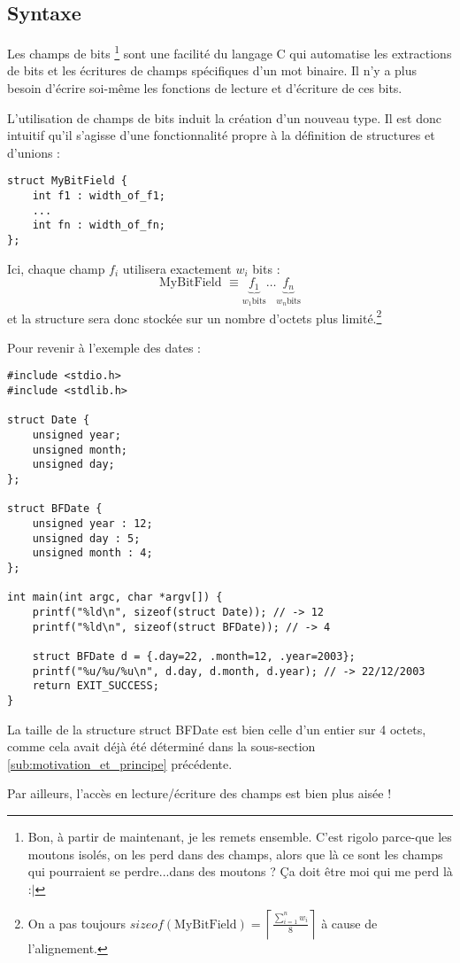 \documentclass[../../../main.tex]{subfiles}
\begin{document}
\subsection{Syntaxe}
\label{sub:syntaxe}
Les champs de bits \footnote{Bon, à partir de maintenant, je les remets ensemble. C'est rigolo parce-que les moutons isolés, on les perd dans des champs, alors que là ce sont les champs qui pourraient se perdre...dans des moutons ? Ça doit être moi qui me perd là :$|$} sont une facilité du langage C qui automatise les extractions de bits et les écritures
de champs spécifiques d'un mot binaire. Il n'y a plus besoin d'écrire soi-même les fonctions de lecture
et d'écriture de ces bits.

L'utilisation de champs de bits induit la création d'un nouveau type. Il est donc intuitif qu'il s'agisse d'une fonctionnalité propre à la définition de structures et d'unions :
\begin{verbatim}
struct MyBitField {
	int f1 : width_of_f1;
	...
	int fn : width_of_fn;
};
\end{verbatim}
Ici, chaque champ $f_{i}$ utilisera exactement $w_{i}$ bits :
$$\text{MyBitField }\equiv \underbrace{f_{1}}_{w_{1} \text{bits}}\dots \underbrace{f_{n}}_{w_{n} \text{bits}}$$
et la structure sera donc stockée sur un nombre d'octets plus limité.\footnote{On a pas toujours $sizeof(\text{MyBitField}) = \displaystyle\left\lceil\frac{\sum_{i= 1}^{n}w_{i}}{8}\right\rceil$ à cause de l'alignement.}

Pour revenir à l'exemple des dates :
\begin{verbatim}
#include <stdio.h>
#include <stdlib.h>

struct Date {
	unsigned year;
	unsigned month;
	unsigned day;
};

struct BFDate {
	unsigned year : 12;
	unsigned day : 5;
	unsigned month : 4;
};

int main(int argc, char *argv[]) {
	printf("%ld\n", sizeof(struct Date)); // -> 12
	printf("%ld\n", sizeof(struct BFDate)); // -> 4

	struct BFDate d = {.day=22, .month=12, .year=2003};
	printf("%u/%u/%u\n", d.day, d.month, d.year); // -> 22/12/2003
	return EXIT_SUCCESS;
}
\end{verbatim}
La taille de la structure \textsf{struct BFDate} est bien celle d'un entier sur 4 octets, comme cela avait déjà été déterminé dans la sous-section \ref{sub:motivation_et_principe} précédente.

Par ailleurs, l'accès en lecture/écriture des champs est bien plus aisée !
\end{document}
